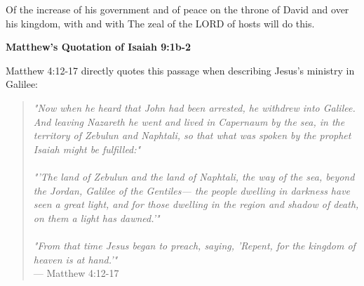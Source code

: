 \documentclass[11pt]{article}
\begin{document}
\begin{biblicaloutline}[Isaiah 9:1b-7]
\begin{versesection}{2em}
        { Of the increase of his government and of peace}
        {on the throne of David and over his kingdom,}
        {with  and with }
        {The zeal of the LORD of hosts will do this.}
    \end{versesection}

\end{biblicaloutline}

\newpage
{\large\bfseries Matthew's Quotation of Isaiah 9:1b-2}
\vspace{1em}

Matthew 4:12-17 directly quotes this passage when describing Jesus's ministry in Galilee:

\begin{quote}
\textit{"Now when he heard that John had been arrested, he withdrew into Galilee. And leaving Nazareth he went and lived in Capernaum by the sea, in the territory of Zebulun and Naphtali, so that what was spoken by the prophet Isaiah might be fulfilled:"}\\\\
\textit{"'The land of Zebulun and the land of Naphtali, the way of the sea, beyond the Jordan, Galilee of the Gentiles— the people dwelling in darkness have seen a great light, and for those dwelling in the region and shadow of death, on them a light has dawned.'"}\\\\
\textit{"From that time Jesus began to preach, saying, 'Repent, for the kingdom of heaven is at hand.'"}\\
\hfill --- Matthew 4:12-17
\end{quote}

\vspace{1em}
\end{document}
